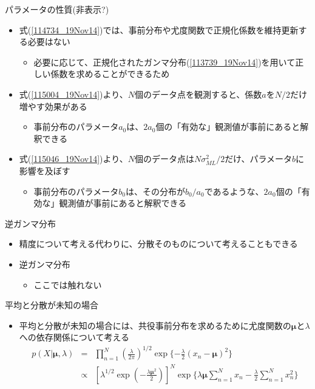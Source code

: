 \begin{frame}{パラメータの性質(非表示?)}
 \begin{itemize}
  \item 式(\ref{114734_19Nov14})では、事前分布や尤度関数で正規化係数を維持更新する必要はない
        \begin{itemize}
         \item 必要に応じて、正規化されたガンマ分布(\ref{113739_19Nov14})を用いて正しい係数を求めることができるため
        \end{itemize}
  \item 式(\ref{115004_19Nov14})より、$N$個のデータ点を観測すると、係数$a$を$N/2$だけ増やす効果がある
        \begin{itemize}
         \item 事前分布のパラメータ$a_0$は、$2a_0$個の「有効な」観測値が事前にあると解釈できる
        \end{itemize}
  \item 式(\ref{115046_19Nov14})より、$N$個のデータ点は$N\sigma_{ML}^2/2$だけ、パラメータ$b$に影響を及ぼす
        \begin{itemize}
         \item 事前分布のパラメータ$b_0$は、その分布が$b_0/a_0$であるような、$2a_0$個の「有効な」観測値が事前にあると解釈できる
        \end{itemize}
 \end{itemize}
\end{frame}

\begin{frame}{逆ガンマ分布}
 \begin{itemize}
  \item 精度について考える代わりに、分散そのものについて考えることもできる
  \item 逆ガンマ分布
        \begin{itemize}
         \item ここでは触れない
        \end{itemize}
 \end{itemize}
\end{frame}

\begin{frame}{平均と分散が未知の場合}
 \begin{itemize}
  \item \alert{平均と分散が未知}の場合には、共役事前分布を求めるために尤度関数の$\bm{\mu}$と$\lambda$への依存関係について考える
        \begin{eqnarray}
         p(X|\bm{\mu},\lambda) &=& \prod_{n=1}^{N}(\frac{\lambda}{2\pi})^{1/2}\exp\{-\frac{\lambda}{2}(x_n-\bm{\mu})^2\} \nonumber \\
         &\propto & [\lambda^{1/2}\exp(-\frac{\lambda\bm{\mu}^2}{2})]^{N}\exp\{\lambda\bm{\mu}\sum_{n=1}^{N}x_n-\frac{\lambda}{2}\sum_{n=1}^{N}x_n^2\}
        \end{eqnarray}
 \end{itemize}
\end{frame}

